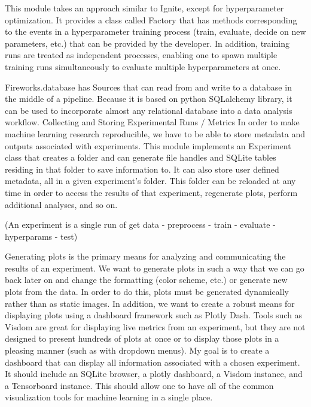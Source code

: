 \documentclass[letterpaper,10pt,english]{sphinxmanual}
\begin{document}

This module takes an approach similar to Ignite, except for hyperparameter optimization. It provides a class called Factory that has methods corresponding to the events in a hyperparameter training process (train, evaluate, decide on new parameters, etc.) that can be provided by the developer. In addition, training runs are treated as independent processes, enabling one to spawn multiple training runs simultaneously to evaluate multiple hyperparameters at once.


Fireworks.database has Sources that can read from and write to a database in the middle of a pipeline. Because it is based on python SQLalchemy library, it can be used to incorporate almost any relational database into a data analysis workflow.
Collecting and Storing Experimental Runs / Metrics
In order to make machine learning research reproducible, we have to be able to store metadata and outputs associated with experiments. This module implements an Experiment class that creates a folder and can generate file handles and SQLite tables residing in that folder to save information to. It can also store user defined metadata, all in a given experiment’s folder. This folder can be reloaded at any time in order to access the results of that experiment, regenerate plots, perform additional analyses, and so on.


(An experiment is a single run of get data - preprocess - train - evaluate - hyperparams - test)


Generating plots is the primary means for analyzing and communicating the results of an experiment. We want to generate plots in such a way that we can go back later on and change the formatting (color scheme, etc.) or generate new plots from the data. In order to do this, plots must be generated dynamically rather than as static images. In addition, we want to create a robust means for displaying plots using a dashboard framework such as Plotly Dash. Tools such as Visdom are great for displaying live metrics from an experiment, but they are not designed to present hundreds of plots at once or to display those plots in a pleasing manner (such as with dropdown menus).
My goal is to create a dashboard that can display all information associated with a chosen experiment. It should include an SQLite browser, a plotly dashboard, a Visdom instance, and a Tensorboard instance. This should allow one to have all of the common visualization tools for machine learning in a single place.
\end{document}

